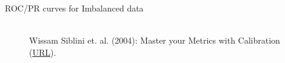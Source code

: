 \begin{vbframe}{ROC/PR curves for Imbalanced data}
		\begin{figure}
			\centering
			\tiny
			\\ Wissam Siblini et. al. (2004): Master your Metrics with Calibration
			(\href{https://arxiv.org/pdf/1909.02827.pdf}{\underline{URL}}).
		\end{figure}
		
		
	\end{vbframe}

